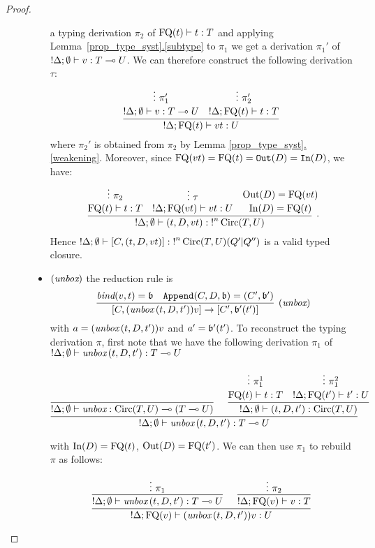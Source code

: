 \documentclass[twoside]{article}
\begin{document}
\begin{proof}
\begin{description}
\begin{itemize}
  a typing derivation $\pi_2$ of $\mathop{\textrm{FQ}}\nolimits(t)\vdash t:T$ and applying 
  Lemma~\hyperref[subtype]{\ref*{prop_type_syst}.\ref*{subtype}}
  to $\pi_1$ we get a derivation $\pi_1'$ of ${!}\Delta ;\emptyset\vdash v:T\multimap U$.
  We can therefore construct the following derivation $\tau$:
  \[
  \infer[]{{!}\Delta;\FQ(t)\entails vt : U}{
    \deduce[]{{!}\Delta ;\emptyset\entails v:T\loli U}{
      \vdots ~\pi_1'
    }
    &
    \deduce[]{{!}\Delta;\FQ(t)\entails t:T}{
      \vdots ~\pi_2'
    }
  }
  \]
  where $\pi_2'$ is obtained from $\pi_2$ by Lemma 
  \hyperref[weakening]{\ref*{prop_type_syst}.\ref*{weakening}}.
  Moreover, since $\mathop{\textrm{FQ}}\nolimits(vt)=\mathop{\textrm{FQ}}\nolimits(t)=\mathtt{Out}(D)=\mathtt{In}(D)$, 
  we have:
  \[
  \infer[.]{{!}\Delta;\emptyset \entails (t,D,vt):{!}^n\Circ(T,U)}{
    \deduce[]{\FQ(t)\entails t:T}{
      \vdots~\pi_2
    }
    &
    \deduce[]{{!}\Delta ; \FQ(vt)\entails vt:U}{
      \vdots~\tau
    } 
    &
    \deduce[]{\In(D)=\FQ(t) }{
      \Out(D)=\FQ(vt)
    }
  }
  \]  
  Hence ${!}\Delta ;\emptyset \vdash [C,(t,D,vt)]:{!}^n\mathop{\textrm{Circ}}\nolimits(T,U) (Q'|Q'')$ is 
  a valid typed closure.
  \item $(\mathop{\textit{unbox}}\nolimits)$ the reduction rule is
  \[
    \infer[(\unbox)]{[C,(\unbox\,(t,D,t'))v]\to [C',\binding'(t')]}{
      \bind(v,t)=\binding 
      &
      \mathtt{Append}(C,D,\binding) = (C',\binding') 
    }
  \]
  with $a=(\mathop{\textit{unbox}}\nolimits\,(t,D,t'))v$ and $a'=\mathfrak{b}'(t')$. 
  To reconstruct the typing derivation $\pi$, first note 
  that we have the following derivation $\pi_1$ of    
  ${!}\Delta;\emptyset\vdash \mathop{\textit{unbox}}\nolimits\,(t,D,t'):T\multimap U$
  \begin{footnotesize}
  \[
    \infer[]{{!}\Delta;\emptyset\entails \unbox\,(t,D,t'):T\loli U}{
      \infer[]{{!}\Delta;\emptyset \entails \unbox:\Circ(T,U)\loli (T\loli U)}{
      }   
      &
      \infer[]{{!}\Delta ;\emptyset\entails (t,D,t'):\Circ(T,U)}{
        \deduce[]{\FQ(t)\entails t:T}{
          \vdots ~\pi_1^1
        }
        &
        \deduce[]{{!}\Delta;\FQ(t')\entails t':U}{
          \vdots ~\pi_1^2     
        }
      }
    }
    \]
    \end{footnotesize} 
  with $\mathop{\textrm{In}}\nolimits(D)=\mathop{\textrm{FQ}}\nolimits(t)$, $\mathop{\textrm{Out}}\nolimits(D)=\mathop{\textrm{FQ}}\nolimits(t')$. We can then use $\pi_1$ 
  to rebuild $\pi$ as follows:
  \begin{footnotesize}
  \[
  \infer[]{{!}\Delta; \FQ(v)\entails (\unbox\,(t,D,t'))v :U}{
    \infer[]{{!}\Delta;\emptyset\entails \unbox\,(t,D,t'):T\loli U}{
      \vdots~\pi_1            
    }
    &
    \infer[]{{!}\Delta ; \FQ(v)\entails v:T}{
      \vdots~\pi_2
    }
  }
  \]
  \end{footnotesize} 

\end{itemize}
\end{description}
\end{proof}
\end{document}
